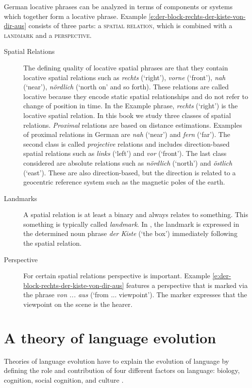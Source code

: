 German locative phrases can be analyzed in terms of components 
or systems which together form a locative phrase. Example 
\ref{e:der-block-rechts-der-kiste-von-dir-aus} consists of three parts: 
a \textsc{spatial relation}, which is combined with a \textsc{landmark} and 
a \textsc{perspective}.

\begin{description}
\item[Spatial Relations] The defining quality of locative spatial phrases
are that they contain locative spatial relations such as 
\textit{rechts} (`right'), \textit{vorne} (`front'), \textit{nah} (`near'), 
\textit{n\"ordlich} (`north on' and so forth).
These relations are called locative because they encode
static spatial relationships and do not refer to change of position in time. 
In the Example phrase, \textit{rechts} (`right') is the locative spatial relation.
In this book we study three classes of spatial relations. 
\emph{Proximal} relations are based on distance estimations. 
Examples of proximal relations in German are \textit{nah} (`near') and \textit{fern} (`far').
The second class is called \emph{projective}
relations and includes direction-based spatial relations such as \textit{links} (`left') and \textit{vor} (`front').
The last class considered are absolute relations such as \textit{n\"ordlich}
(`north') and \textit{\"ostlich} (`east'). These are also direction-based, but the direction
is related to a geocentric reference system such as the magnetic poles of the
earth.
\item[Landmarks] A spatial relation is at least a binary and always
relates to something. This something is typically called \emph{landmark}.
In , the landmark 
is expressed in the determined noun phrase 
\textit{der Kiste} (`the box') immediately following the spatial relation.
\item[Perspective] For certain spatial relations perspective is important.
Example \ref{e:der-block-rechts-der-kiste-von-dir-aus} features a 
perspective that is marked via the phrase \textit{von ... aus} (`from ... viewpoint').
The marker expresses that the viewpoint on the scene is the hearer. 
\end{description}

\section{A theory of language evolution}
\label{s:intro-evolutionary-linguistics}
Theories of language evolution have to explain the evolution of language
by defining the role and contribution of four different factors on language:
biology, cognition, social cognition, and culture 
\citep{steels2009cognition,steels2011self-organization}. 

